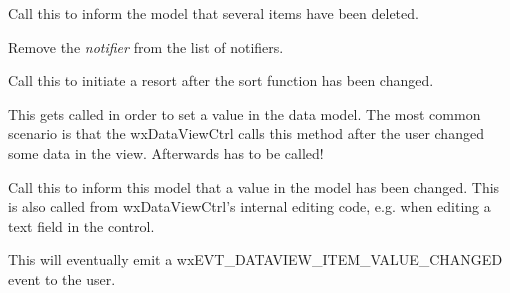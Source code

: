\label{wxdataviewmodelitemsdeleted}


Call this to inform the model that several items have been deleted.

\label{wxdataviewmodelremovenotifier}


Remove the {\it notifier} from the list of notifiers.

\label{wxdataviewmodelresort}


Call this to initiate a resort after the sort function has
been changed.

\label{wxdataviewmodelsetvalue}


This gets called in order to set a value in the data model.
The most common scenario is that the wxDataViewCtrl calls
this method after the user changed some data in the view.
Afterwards 
has to be called!

\label{wxdataviewmodelvaluechanged}


Call this to inform this model that a value in the model has
been changed. This is also called from wxDataViewCtrl's
internal editing code, e.g. when editing a text field 
in the control.

This will eventually emit a wxEVT\_DATAVIEW\_ITEM\_VALUE\_CHANGED
event to the user.

